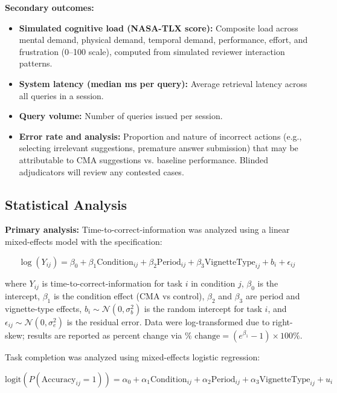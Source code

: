 \documentclass[preprint,12pt]{elsarticle}
\begin{document}
\textbf{Secondary outcomes:}
\begin{itemize}
  \item \textbf{Simulated cognitive load (NASA-TLX score):} Composite load across mental demand, physical demand, temporal demand, performance, effort, and frustration (0--100 scale), computed from simulated reviewer interaction patterns.
  \item \textbf{System latency (median ms per query):} Average retrieval latency across all queries in a session.
  \item \textbf{Query volume:} Number of queries issued per session.
  \item \textbf{Error rate and analysis:} Proportion and nature of incorrect actions (e.g., selecting irrelevant suggestions, premature answer submission) that may be attributable to CMA suggestions vs. baseline performance. Blinded adjudicators will review any contested cases.
\end{itemize}

\subsection{Statistical Analysis}

\textbf{Primary analysis:} Time-to-correct-information was analyzed using a linear mixed-effects model with the specification:

\begin{equation}
\log(Y_{ij}) = \beta_0 + \beta_1 \text{Condition}_{ij} + \beta_2 \text{Period}_{ij} + \beta_3 \text{VignetteType}_{ij} + b_i + \epsilon_{ij}
\end{equation}

where $Y_{ij}$ is time-to-correct-information for task $i$ in condition $j$, $\beta_0$ is the intercept, $\beta_1$ is the condition effect (CMA vs control), $\beta_2$ and $\beta_3$ are period and vignette-type effects, $b_i \sim \mathcal{N}(0, \sigma_b^2)$ is the random intercept for task $i$, and $\epsilon_{ij} \sim \mathcal{N}(0, \sigma_e^2)$ is the residual error. Data were log-transformed due to right-skew; results are reported as percent change via $\% \text{ change} = (e^{\beta_1} - 1) \times 100\%$.

Task completion was analyzed using mixed-effects logistic regression:

\begin{equation}
\text{logit}(P(\text{Accuracy}_{ij} = 1)) = \alpha_0 + \alpha_1 \text{Condition}_{ij} + \alpha_2 \text{Period}_{ij} + \alpha_3 \text{VignetteType}_{ij} + u_i
\end{equation}
\end{document}
